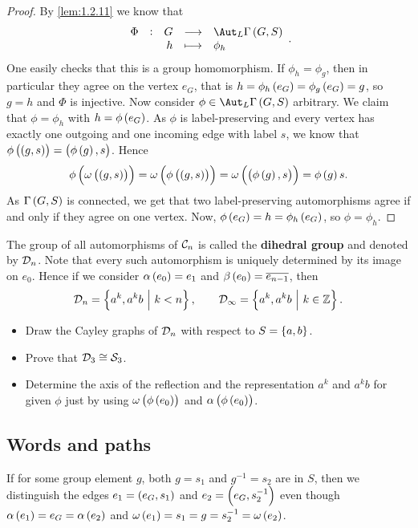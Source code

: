 \begin{proof}
By \ref{lem:1.2.11} we know that
$$ \function[\Phi]{G}{\Aut_L \Gamma\br{G, S}}{h}{\phi_h}. $$
One easily checks that this is a group homomorphism. If $ \phi_h = \phi_g $, then in particular they agree on the vertex $ e_G $, that is $ h = \phi_h\br{e_G} = \phi_g\br{e_G} = g $, so $ g = h $ and $ \Phi $ is injective. Now consider $ \phi \in \Aut_L \Gamma\br{G, S} $ arbitrary. We claim that $ \phi = \phi_h $ with $ h = \phi\br{e_G} $. As $ \phi $ is label-preserving and every vertex has exactly one outgoing and one incoming edge with label $ s $, we know that $ \phi\br{\br{g, s}} = \br{\phi\br{g}, s} $. Hence
$$ \phi\br{\omega\br{\br{g, s}}} = \omega\br{\phi\br{\br{g, s}}} = \omega\br{\br{\phi\br{g}, s}} = \phi\br{g}s. $$
As $ \Gamma\br{G, S} $ is connected, we get that two label-preserving automorphisms agree if and only if they agree on one vertex. Now, $ \phi\br{e_G} = h = \phi_h\br{e_G} $, so $ \phi = \phi_h $.
\end{proof}

\begin{example}
The group of all automorphisms of $ \mathcal{C}_n $ is called the \textbf{dihedral group} and denoted by $ \mathcal{D}_n $. Note that every such automorphism is uniquely determined by its image on $ e_0 $. Hence if we consider $ \alpha\br{e_0} = e_1 $ and $ \beta\br{e_0} = \overline{e_{n - 1}} $, then
$$ \DDD_n = \cbr{a^k, a^kb \st k < n}, \qquad \DDD_\infty = \cbr{a^k, a^kb \st k \in \ZZ}. $$
\end{example}

\begin{exercise}
\hfill
\begin{itemize}
\item Draw the Cayley graphs of $ \mathcal{D}_n $ with respect to $ S = \cbr{a, b} $.
\item Prove that $ \mathcal{D}_3 \cong \mathcal{S}_3 $.
\item Determine the axis of the reflection and the representation $ a^k $ and $ a^kb $ for given $ \phi $ just by using $ \omega\br{\phi\br{e_0}} $ and $ \alpha\br{\phi\br{e_0}} $.
\end{itemize}
\end{exercise}

\subsection{Words and paths}

\begin{note*}
If for some group element $ g $, both $ g = s_1 $ and $ g^{-1} = s_2 $ are in $ S $, then we distinguish the edges $ e_1 = \br{e_G, s_1} $ and $ e_2 = \br{e_G, s_2^{-1}} $ even though $ \alpha\br{e_1} = e_G = \alpha\br{e_2} $ and $ \omega\br{e_1} = s_1 = g = s_2^{-1} = \omega\br{e_2} $.
\end{note*}


